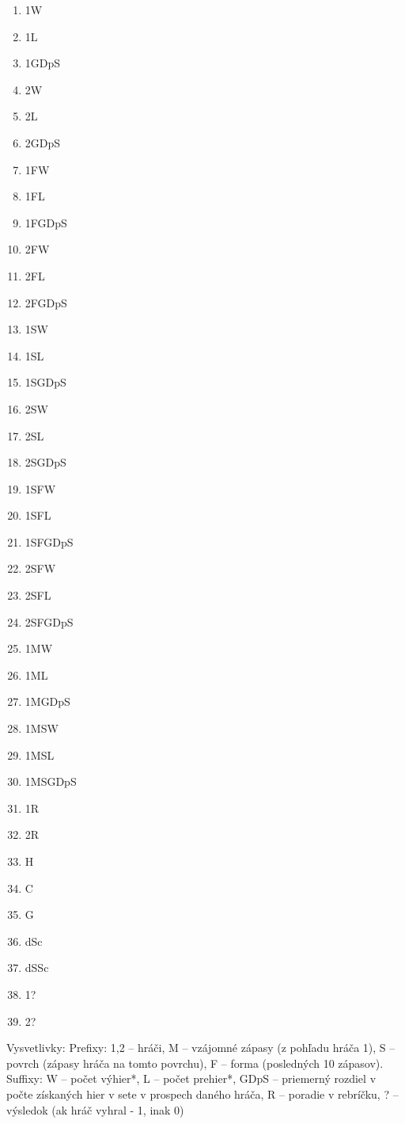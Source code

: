 \iffalse
\begin{multicols}{2}
\begin{enumerate}
 \item 1W
 \item 1L
 \item 1GDpS
 \item 2W
 \item 2L
 \item 2GDpS
 \item 1FW
 \item 1FL
 \item 1FGDpS
 \item 2FW
 \item 2FL
 \item 2FGDpS
 \item 1SW
 \item 1SL
 \item 1SGDpS
 \item 2SW
 \item 2SL
 \item 2SGDpS
 \item 1SFW
 \item 1SFL
 \item 1SFGDpS
 \item 2SFW
 \item 2SFL
 \item 2SFGDpS
 \item 1MW
 \item 1ML
 \item 1MGDpS
 \item 1MSW
 \item 1MSL
 \item 1MSGDpS
 \item 1R
 \item 2R
 \item H
 \item C
 \item G
 \item dSc
 \item dSSc
 \item 1?
 \item 2?
\end{enumerate}
\end{multicols}
Vysvetlivky: Prefixy: {1,2} -- hráči, M -- vzájomné zápasy (z pohľadu hráča 1), S -- povrch (zápasy hráča na tomto povrchu), F -- forma (posledných 10 zápasov).
Suffixy: W -- počet výhier*, L -- počet prehier*, GDpS -- priemerný rozdiel v počte získaných hier v sete v prospech daného hráča, R -- poradie v rebríčku, ? -- výsledok (ak hráč vyhral - 1, inak 0)
